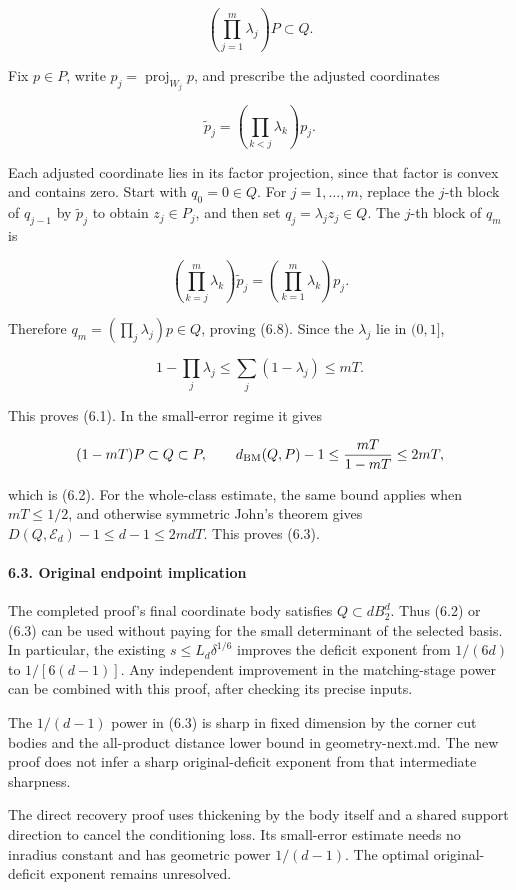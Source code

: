 \documentclass[
  11pt,
]{article}
\begin{document}
\[
\left(\prod_{j=1}^m\lambda_j\right)P\subset Q.         \tag{6.8}
\]

Fix \(p\in P\), write \(p_j=\operatorname{proj}_{W_j}p\), and prescribe
the adjusted coordinates

\[
\widetilde p_j=\left(\prod_{k<j}\lambda_k\right)p_j.
\]

Each adjusted coordinate lies in its factor projection, since that
factor is convex and contains zero. Start with \(q_0=0\in Q\). For
\(j=1,\ldots,m\), replace the \(j\)-th block of \(q_{j-1}\) by
\(\widetilde p_j\) to obtain \(z_j\in P_j\), and then set
\(q_j=\lambda_j z_j\in Q\). The \(j\)-th block of \(q_m\) is

\[
\left(\prod_{k=j}^m\lambda_k\right)\widetilde p_j
=\left(\prod_{k=1}^m\lambda_k\right)p_j.
\]

Therefore \(q_m=(\prod_j\lambda_j)p\in Q\), proving (6.8). Since the
\(\lambda_j\) lie in \((0,1]\),

\[
1-\prod_j\lambda_j\le\sum_j(1-\lambda_j)\le mT.
\]

This proves (6.1). In the small-error regime it gives

\[
(1-mT)P\subset Q\subset P,\qquad
d_{\rm BM}(Q,P)-1
 \le\frac{mT}{1-mT}\le2mT,
\]

which is (6.2). For the whole-class estimate, the same bound applies
when \(mT\le1/2\), and otherwise symmetric John's theorem gives
\(D(Q,\mathcal E_d)-1\le d-1\le2mdT\). This proves (6.3).

\paragraph{6.3. Original endpoint
implication}\label{original-endpoint-implication}

The completed proof's final coordinate body satisfies
\(Q\subset dB_2^d\). Thus (6.2) or (6.3) can be used without paying for
the small determinant of the selected basis. In particular, the existing
\(s\le L_d\delta^{1/6}\) improves the deficit exponent from \(1/(6d)\)
to \(1/[6(d-1)]\). Any independent improvement in the matching-stage
power can be combined with this proof, after checking its precise
inputs.

The \(1/(d-1)\) power in (6.3) is sharp in fixed dimension by the corner
cut bodies and the all-product distance lower bound in geometry-next.md.
The new proof does not infer a sharp original-deficit exponent from that
intermediate sharpness.

The direct recovery proof uses thickening by the body itself and a
shared support direction to cancel the conditioning loss. Its
small-error estimate needs no inradius constant and has geometric power
\(1/(d-1)\). The optimal original-deficit exponent remains unresolved.
\end{document}
